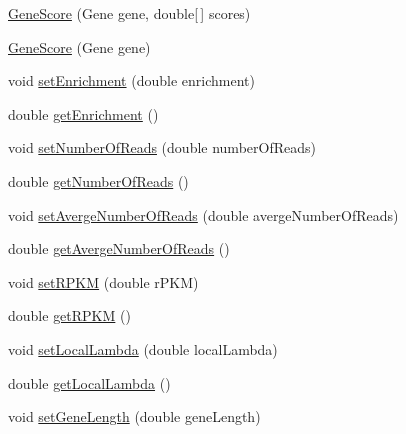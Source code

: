 \begin{DoxyCompactItemize}
\item 
\hyperlink{classbroad_1_1pda_1_1seq_1_1segmentation_1_1_gene_score_a64719ea8716d20908ad1b91dc845e7fe}{Gene\+Score} (Gene gene, double\mbox{[}$\,$\mbox{]} scores)
\item 
\hyperlink{classbroad_1_1pda_1_1seq_1_1segmentation_1_1_gene_score_abdc52efe75190cd8d88e6974474a3085}{Gene\+Score} (Gene gene)
\item 
void \hyperlink{classbroad_1_1pda_1_1seq_1_1segmentation_1_1_gene_score_aacb060ae70cc90fee43fa6c60439ba20}{set\+Enrichment} (double enrichment)
\item 
double \hyperlink{classbroad_1_1pda_1_1seq_1_1segmentation_1_1_gene_score_a713c54de24705c9dcc2ac273b8d52d11}{get\+Enrichment} ()
\item 
void \hyperlink{classbroad_1_1pda_1_1seq_1_1segmentation_1_1_gene_score_ac0bc6e6729191cac4dad559a08daab76}{set\+Number\+Of\+Reads} (double number\+Of\+Reads)
\item 
double \hyperlink{classbroad_1_1pda_1_1seq_1_1segmentation_1_1_gene_score_a0ff304f3db77f29bb3f7f1b4a57faa4b}{get\+Number\+Of\+Reads} ()
\item 
void \hyperlink{classbroad_1_1pda_1_1seq_1_1segmentation_1_1_gene_score_afb91d7ac4cc367fecb0312242af171d1}{set\+Averge\+Number\+Of\+Reads} (double averge\+Number\+Of\+Reads)
\item 
double \hyperlink{classbroad_1_1pda_1_1seq_1_1segmentation_1_1_gene_score_a45fb0a85f59876c037b4d0fdd6730cfe}{get\+Averge\+Number\+Of\+Reads} ()
\item 
void \hyperlink{classbroad_1_1pda_1_1seq_1_1segmentation_1_1_gene_score_a5b1c5b65fd25bede453dd30f55808bff}{set\+R\+P\+K\+M} (double r\+P\+K\+M)
\item 
double \hyperlink{classbroad_1_1pda_1_1seq_1_1segmentation_1_1_gene_score_a770599865ed2f8b51cfe6fc277c7a029}{get\+R\+P\+K\+M} ()
\item 
void \hyperlink{classbroad_1_1pda_1_1seq_1_1segmentation_1_1_gene_score_a5e775112376674814357454a6087a458}{set\+Local\+Lambda} (double local\+Lambda)
\item 
double \hyperlink{classbroad_1_1pda_1_1seq_1_1segmentation_1_1_gene_score_ad50650eb826331cc8ac828b169f03482}{get\+Local\+Lambda} ()
\item 
void \hyperlink{classbroad_1_1pda_1_1seq_1_1segmentation_1_1_gene_score_aacdf2e47b32561b897f8fc01ced14e29}{set\+Gene\+Length} (double gene\+Length)
\item 

\end{DoxyCompactItemize}
